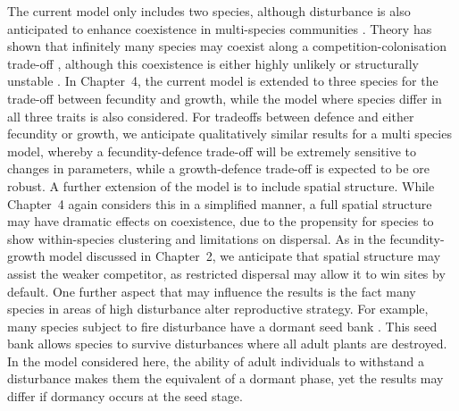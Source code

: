 The current model only includes two species, although disturbance is also anticipated to enhance coexistence in multi-species communities \citep[e.g.][]{loehle2000strategy,roxburgh2004intermediate}. Theory has shown that infinitely many species may coexist along a competition-colonisation trade-off \citep{tilman1994competition,adler2000space}, although this coexistence is either highly unlikely or structurally unstable \citep{nattrass2012quantifying, gyllenberg2005impossibility}. In Chapter~4, the current model is extended to three species for the trade-off between fecundity and growth, while the model where species differ in all three traits is also considered. For tradeoffs between defence and either fecundity or growth, we anticipate qualitatively similar results for a multi species model, whereby a fecundity-defence trade-off will be extremely sensitive to changes in parameters, while a growth-defence trade-off is expected to be ore robust. A further extension of the model is to include spatial structure. While Chapter~4 again considers this in a simplified manner, a full spatial structure may have dramatic effects on coexistence, due to the propensity for species to show within-species clustering \citep{condit2000spatial,murrell2001uniting} and limitations on dispersal. As in the fecundity-growth model discussed in Chapter~2, we anticipate that spatial structure may assist the weaker competitor, as restricted dispersal may allow it to win sites by default. One further aspect that may influence the results is the fact many species in areas of high disturbance alter reproductive strategy. For example, many species subject to fire disturbance have a dormant seed bank \citep[e.g.][]{morgan1988seed,valbuena2001contribution}. This seed bank allows species to survive disturbances where all adult plants are destroyed. In the model considered here, the ability of adult individuals to withstand a disturbance makes them the equivalent of a dormant phase, yet the results may differ if dormancy occurs at the seed stage.


